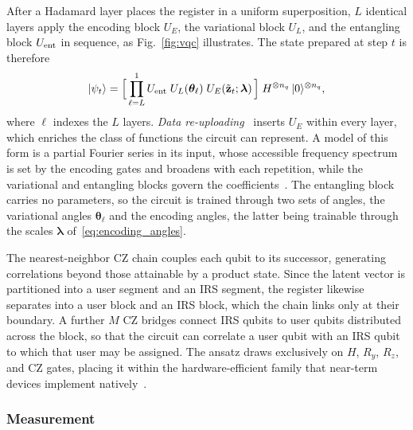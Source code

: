 \documentclass[12pt,onecolumn]{IEEEtran}
\begin{document}
After a Hadamard layer places the register in a uniform superposition, $L$ identical layers apply the encoding block $U_E$, the variational block $U_L$, and the entangling block $U_{\rm ent}$ in sequence, as Fig.~\ref{fig:vqc} illustrates.
The state prepared at step $t$ is therefore
\begin{equation}
    |\psi_t\rangle
    =
    \Bigl[\,\prod_{\ell=L}^{1}
      U_{\rm ent}\;U_L(\boldsymbol{\theta}_\ell)\;U_E(\tilde{\mathbf{z}}_t;\boldsymbol{\lambda})
    \,\Bigr]\;
    H^{\otimes n_q}\,|0\rangle^{\otimes n_q},
    \label{eq:vqc_state}
\end{equation}
where $\ell$ indexes the $L$ layers.
\emph{Data re-uploading}~\cite{perez2020data} inserts $U_E$ within every layer, which enriches the class of functions the circuit can represent.
A model of this form is a partial Fourier series in its input, whose accessible frequency spectrum is set by the encoding gates and broadens with each repetition, while the variational and entangling blocks govern the coefficients~\cite{schuld2021effect}.
The entangling block carries no parameters, so the circuit is trained through two sets of angles, the variational angles $\boldsymbol{\theta}_\ell$ and the encoding angles, the latter being trainable through the scales $\boldsymbol{\lambda}$ of~\eqref{eq:encoding_angles}.

The nearest-neighbor CZ chain couples each qubit to its successor, generating correlations beyond those attainable by a product state.
Since the latent vector is partitioned into a user segment and an IRS segment, the register likewise separates into a user block and an IRS block, which the chain links only at their boundary.
A further $M$ CZ bridges connect IRS qubits to user qubits distributed across the block, so that the circuit can correlate a user qubit with an IRS qubit to which that user may be assigned.
The ansatz draws exclusively on $H$, $R_y$, $R_z$, and CZ gates, placing it within the hardware-efficient family that near-term devices implement natively~\cite{kandala2017hardware}.



\subsubsection{Measurement}
\end{document}
